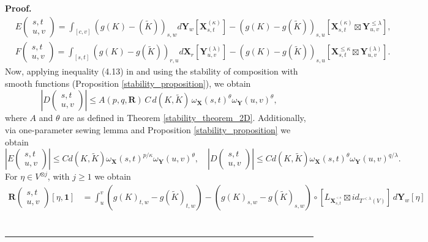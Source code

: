 \documentclass{article}%
\newenvironment{proof}[1][Proof]{\noindent\textbf{#1.} }{\ \rule{0.5em}{0.5em}}
\begin{document}
\begin{proof}
\begin{align*}
&E \begin{pmatrix} s,t \\ u,v \end{pmatrix} =\int_{[c,v]} (g(K) -(\tilde{K}))_{s,w} d\mathbf{Y}_w \left[ \mathbf{X}^{(\kappa)}_{s,t}\right]  - (g(K)-g(\tilde{K}))_{s,u}\left[ \mathbf{X}^{(\kappa)}_{s,t} \boxtimes \mathbf{Y}^{\leq \lambda}_{u,v}\right],\\
&F \begin{pmatrix} s,t \\ u,v \end{pmatrix} =   \int_{[s,t]}(g(K)-g(\tilde{K}))_{r,u}d\mathbf{X}_r \left[ \mathbf{Y}^{(\lambda)}_{u,v}\right] - (g(K)-g(\tilde{K}))_{s,u}\left[ \mathbf{X}^{\leq \kappa}_{s,t} \boxtimes \mathbf{Y}^{(\lambda)}_{u,v}\right].
\end{align*}
Now, applying inequality (4.13) in \cite{cass2023fubini} and using the stability of composition with smooth functions (Proposition \ref{stability_proposition}), we obtain
\[
\left|D\begin{pmatrix} s,t \\ u,v \end{pmatrix} \right|
\leq A(p,q,\mathbf{R})\, C\, d(K,\tilde{K})\, \omega_{\mathbf{X}}(s,t)^{\theta}\omega_{\mathbf{Y}}(u,v)^{\theta},
\]
where $A$ and $\theta$ are as defined in Theorem \ref{stability_theorem_2D}.\newline
Additionally, via one-parameter sewing lemma and Proposition \ref{stability_proposition} we obtain 
\[
\left|E\begin{pmatrix} s,t \\ u,v \end{pmatrix} \right| \leq C d(K, \tilde K) \omega_{\mathbf{X}}(s,t)^{p/\kappa}\omega_{\mathbf{Y}}(u,v)^{\theta}, \quad \left|D\begin{pmatrix} s,t \\ u,v \end{pmatrix} \right|\leq C d(K, \tilde K) \omega_{\mathbf{X}}(s,t)^{\theta}\omega_{\mathbf{Y}}(u,v)^{q/\lambda} . 
\]
For $\eta \in V^{\otimes j}$, with $j \ge 1$ we obtain
\begin{align*}
\mathbf{R} \begin{pmatrix} s,t \\ u,v \end{pmatrix}[\eta, \mathbf{1}] &= \int_u^v \left(g(K)_{t,w} - g(\tilde{K})_{t,w} \right) - \left( g(K)_{s,w} - g(\tilde{K})_{s,w}\right) \circ \left[L_{\mathbf{X}^{^{< \kappa}}_{s,t}} \boxtimes id_{T^{< \lambda}(V)} \right]\, d \mathbf{Y}_w[\eta]\\

\end{align*}
\end{proof}
\end{document}
